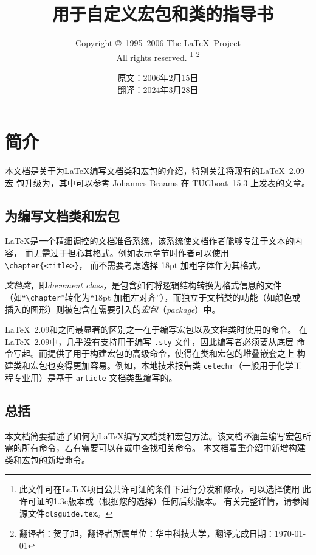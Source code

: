 \documentclass{ltxguide}[1995/11/28]
\title{\LaTeXe~用于自定义宏包和类的指导书}
\author{Copyright \copyright~1995--2006 The \LaTeX\ Project\\
   All rights reserved.%
   \footnote{此文件可在\LaTeX{}项目公共许可证的条件下进行分发和修改，可以选择使用
    此许可证的1.3c版本或（根据您的选择）任何后续版本。
    有关完整详情，请参阅源文件\texttt{clsguide.tex}。}%
   \footnote{翻译者：贺子旭，翻译者所属单位：华中科技大学，翻译完成日期：\today}%
}
\date{原文：2006年2月15日 \\ 翻译：2024年3月28日}
\begin{document}
\maketitle

\tableofcontents

\newpage

\section{简介}

本文档是关于为\LaTeX{}编写文档类和宏包的介绍，特别关注将现有的\LaTeX~2.09宏
包升级为\LaTeXe{}，其中\LaTeXe{}可以参考 Johannes Braams 在 TUGboat~15.3
上发表的文章。

\subsection{为\LaTeXe{}编写文档类和宏包}

\LaTeX{}是一个精细调控的文档准备系统，该系统使文档作者能够专注于文本的内容，
而无需过于担心其格式。例如表示章节时作者可以使用 \verb|\chapter{<title>}|，
而不需要考虑选择 18pt 加粗字体作为其格式。

\emph{文档类}，即\emph{document class}，是包含如何将逻辑结构转换为格式信息的文件
（如“\verb|\chapter|”转化为“18pt 加粗左对齐”），而独立于文档类的功能（如颜色或
插入的图形）则被包含在需要引入的\emph{宏包}（\emph{package}）中。

\LaTeX~2.09和\LaTeXe{}之间最显著的区别之一在于编写宏包以及文档类时使用的命令。
在\LaTeX~2.09中，几乎没有支持用于编写 \verb|.sty| 文件，因此编写者必须要从底层
命令写起。而\LaTeXe{}提供了用于构建宏包的高级命令，使得在类和宏包的堆叠嵌套之上
构建类和宏包也变得更加容易。例如，本地技术报告类 \verb|cetechr|（一般用于化学工
程专业用）是基于 \verb|article| 文档类型编写的。

\subsection{总括}

本文档简要描述了如何为\LaTeX{}编写文档类和宏包方法。该文档\emph{不}涵盖编写宏包所
需的所有命令，若有需要可以在\emph{\LaTeXbook}或\emph{\LaTeXcomp}中查找相关命令。
本文档着重介绍\LaTeXe{}中新增构建类和宏包的新增命令。
\end{document}
